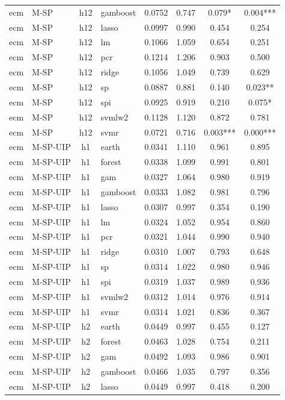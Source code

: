 \begin{ThreePartTable}
\begin{longtable}[t]{llclcccc}
ecm & M-SP & h12 & gamboost & 0.0752 & 0.747 & 0.079* & 0.004***\\
ecm & M-SP & h12 & lasso & 0.0997 & 0.990 & 0.454 & 0.254\\
ecm & M-SP & h12 & lm & 0.1066 & 1.059 & 0.654 & 0.251\\
ecm & M-SP & h12 & pcr & 0.1214 & 1.206 & 0.903 & 0.500\\
ecm & M-SP & h12 & ridge & 0.1056 & 1.049 & 0.739 & 0.629\\
ecm & M-SP & h12 & sp & 0.0887 & 0.881 & 0.140 & 0.023**\\
ecm & M-SP & h12 & spi & 0.0925 & 0.919 & 0.210 & 0.075*\\
ecm & M-SP & h12 & svmlw2 & 0.1128 & 1.120 & 0.872 & 0.781\\
ecm & M-SP & h12 & svmr & 0.0721 & 0.716 & 0.003*** & 0.000***\\
\addlinespace
ecm & M-SP-UIP & h1 & earth & 0.0341 & 1.110 & 0.961 & 0.895\\
ecm & M-SP-UIP & h1 & forest & 0.0338 & 1.099 & 0.991 & 0.801\\
ecm & M-SP-UIP & h1 & gam & 0.0327 & 1.064 & 0.980 & 0.919\\
ecm & M-SP-UIP & h1 & gamboost & 0.0333 & 1.082 & 0.981 & 0.796\\
ecm & M-SP-UIP & h1 & lasso & 0.0307 & 0.997 & 0.354 & 0.190\\
ecm & M-SP-UIP & h1 & lm & 0.0324 & 1.052 & 0.954 & 0.860\\
ecm & M-SP-UIP & h1 & pcr & 0.0321 & 1.044 & 0.990 & 0.940\\
ecm & M-SP-UIP & h1 & ridge & 0.0310 & 1.007 & 0.793 & 0.648\\
ecm & M-SP-UIP & h1 & sp & 0.0314 & 1.022 & 0.980 & 0.946\\
ecm & M-SP-UIP & h1 & spi & 0.0319 & 1.037 & 0.989 & 0.936\\
ecm & M-SP-UIP & h1 & svmlw2 & 0.0312 & 1.014 & 0.976 & 0.914\\
ecm & M-SP-UIP & h1 & svmr & 0.0314 & 1.021 & 0.836 & 0.367\\
\addlinespace
ecm & M-SP-UIP & h2 & earth & 0.0449 & 0.997 & 0.455 & 0.127\\
ecm & M-SP-UIP & h2 & forest & 0.0463 & 1.028 & 0.754 & 0.211\\
ecm & M-SP-UIP & h2 & gam & 0.0492 & 1.093 & 0.986 & 0.901\\
ecm & M-SP-UIP & h2 & gamboost & 0.0466 & 1.035 & 0.797 & 0.356\\
ecm & M-SP-UIP & h2 & lasso & 0.0449 & 0.997 & 0.418 & 0.200\\

\end{longtable}
\end{ThreePartTable}
